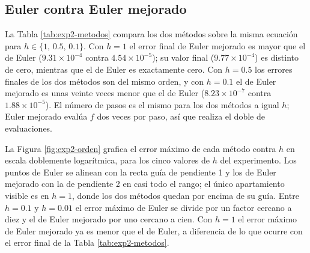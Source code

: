 \begin{table}[htbp]
  \centering
  \caption{Error del método de Euler sobre $x' = -x$, $x(0) = 1$, $0 \le t \le 10$, según el
  tamaño del paso $h$. Se informan el número de pasos, el error absoluto final $E_N$ en
  $t = 10$ y el error absoluto máximo sobre todo el intervalo. Las unidades son las de $x$,
  adimensionales.}
  \label{tab:exp2-error-por-h}
  
\end{table}

\subsection{Euler contra Euler mejorado}
\label{subsec:res-metodos}

La Tabla \ref{tab:exp2-metodos} compara los dos métodos sobre la misma ecuación para
$h \in \{1,\, 0.5,\, 0.1\}$. Con $h = 1$ el error final de Euler mejorado es mayor que el de
Euler ($9.31 \times 10^{-4}$ contra $4.54 \times 10^{-5}$); su valor final
($9.77 \times 10^{-4}$) es distinto de cero, mientras que el de Euler es exactamente cero. Con
$h = 0.5$ los errores finales de los dos métodos son del mismo orden, y con $h = 0.1$ el de Euler
mejorado es unas veinte veces menor que el de Euler ($8.23 \times 10^{-7}$ contra
$1.88 \times 10^{-5}$). El número de pasos es el mismo para los dos métodos a igual $h$; Euler
mejorado evalúa $f$ dos veces por paso, así que realiza el doble de evaluaciones.

\begin{table}[htbp]
  \centering
  \caption{Euler y Euler mejorado sobre $x' = -x$, $x(0) = 1$, $0 \le t \le 10$, para tres
  tamaños de paso. Se informan el valor final $x_N$ en $t = 10$, el error absoluto final $E_N$ y
  el número de pasos. El valor de referencia en $t = 10$ es $e^{-10} \approx 4.54 \times 10^{-5}$.}
  \label{tab:exp2-metodos}
  
\end{table}

La Figura \ref{fig:exp2-orden} grafica el error máximo de cada método contra $h$ en escala
doblemente logarítmica, para los cinco valores de $h$ del experimento. Los puntos de Euler se
alinean con la recta guía de pendiente 1 y los de Euler mejorado con la de pendiente 2 en casi
todo el rango; el único apartamiento visible es en $h = 1$, donde los dos métodos quedan por encima
de su guía. Entre $h = 0.1$ y $h = 0.01$ el error máximo de Euler se divide por un factor
cercano a diez y el de Euler mejorado por uno cercano a cien. Con $h = 1$ el error máximo de
Euler mejorado ya es menor que el de Euler, a diferencia de lo que ocurre con el error final de la
Tabla \ref{tab:exp2-metodos}.

